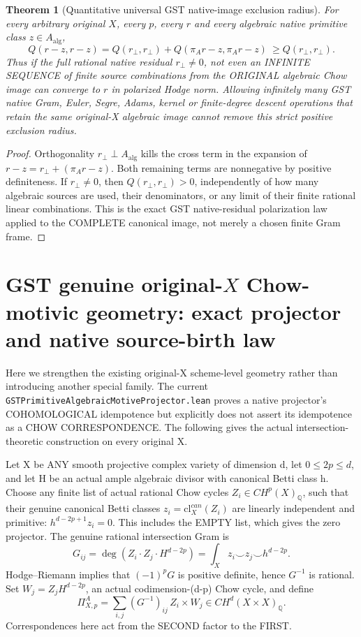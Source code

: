 \documentclass[11pt]{article}
\newcommand{\Q}{\mathbb Q}
\newcommand{\cl}{\mathrm{cl}}
\newtheorem{theorem}{Theorem}
\begin{document}
\begin{theorem}[Quantitative universal GST native-image exclusion radius]
For every arbitrary original
\(X\), every \(p\), every \(r\)
and every algebraic native
primitive class
\(z\in A_{\mathrm{alg}}\),
\[
 \boxed{
 Q(r-z,r-z)
 =Q(r_\perp,r_\perp)
       +Q(\pi_A r-z,\pi_A r-z)
 \ \ge Q(r_\perp,r_\perp).}                       \tag{4}
\]
Thus if the full rational
native residual \(r_\perp\ne0\),
not even an INFINITE SEQUENCE
of finite source combinations
from the ORIGINAL algebraic
Chow image can converge to
\(r\) in polarized Hodge norm.
Allowing infinitely many
GST native Gram, Euler,
Segre, Adams, kernel or
finite-degree descent
operations that retain
the same original-X
algebraic image cannot
remove this strict
positive exclusion radius.
\end{theorem}
\begin{proof}
Orthogonality
\(r_\perp\perp A_{\mathrm{alg}}\)
kills the cross term in
the expansion of
\(r-z=r_\perp+(\pi_A r-z)\).
Both remaining terms are
nonnegative by positive
definiteness. If
\(r_\perp\ne0\), then
\(Q(r_\perp,r_\perp)>0\),
independently of how many
algebraic sources are used,
their denominators, or any
limit of their finite rational
linear combinations.
This is the exact GST
native-residual polarization
law applied to the COMPLETE
canonical image, not merely
a chosen finite Gram frame.
\end{proof}


\section{GST genuine original-\(X\) Chow-motivic geometry: exact projector and native source-birth law}
Here we strengthen the existing original-X scheme-level geometry rather
than introducing another special family. The current
\texttt{GSTPrimitiveAlgebraicMotiveProjector.lean} proves a native
projector's COHOMOLOGICAL idempotence but explicitly does not assert
its idempotence as a CHOW CORRESPONDENCE. The following gives the
actual intersection-theoretic construction on every original X.

Let X be ANY smooth projective complex variety of dimension d,
let \(0\le2p\le d\), and let H be an actual ample algebraic divisor
with canonical Betti class h. Choose any finite list of actual
rational Chow cycles \(Z_i\in CH^p(X)_\Q\), such that their genuine
canonical Betti classes \(z_i=\cl^{can}_X(Z_i)\) are linearly
independent and primitive: \(h^{d-2p+1}z_i=0\).
This includes the EMPTY list, which gives the zero projector.
The genuine rational intersection Gram is
\[
 G_{ij}=\deg(Z_i\cdot Z_j\cdot H^{d-2p})
       =\int_X z_i\smile z_j\smile h^{d-2p}.
\]
Hodge--Riemann implies that \((-1)^pG\) is positive definite,
hence \(G^{-1}\) is rational. Set \(W_j=Z_j H^{d-2p}\),
an actual codimension-(d-p) Chow cycle, and define
\[
 \boxed{\Pi^A_{X,p}=\sum_{i,j}(G^{-1})_{ij}
        \, Z_i\times W_j\in CH^d(X\times X)_\Q.}    \tag{14}
\]
Correspondences here act from the SECOND factor to the FIRST.
\end{document}
